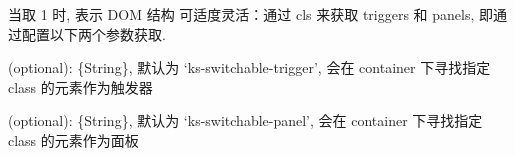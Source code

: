 \documentclass[letterpaper,10pt,english]{sphinxmanual}
\begin{document}
当取 1 时,  表示 DOM 结构 可适度灵活：通过 cls 来获取 triggers 和 panels, 即通过配置以下两个参数获取.


\begin{fulllineitems}
\label{api/component/switchable/switchable:Switchable.Switchable.triggerCls}
(optional): \{String\}, 默认为 `ks-switchable-trigger', 会在 container 下寻找指定 class 的元素作为触发器

\end{fulllineitems}



\begin{fulllineitems}
\label{api/component/switchable/switchable:Switchable.Switchable.panelCls}
(optional):  \{String\}, 默认为 `ks-switchable-panel', 会在 container 下寻找指定 class 的元素作为面板

\end{fulllineitems}
\end{document}

